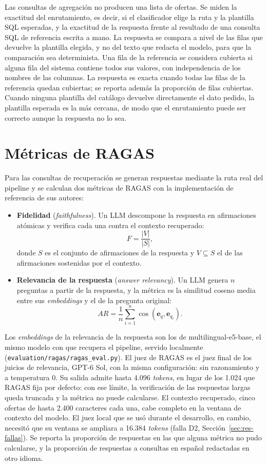 Las consultas de agregación no producen una lista de ofertas. Se miden la exactitud del enrutamiento, es decir, si el clasificador elige la ruta y la plantilla SQL esperadas, y la exactitud de la respuesta frente al resultado de una consulta SQL de referencia escrita a mano. La respuesta se compara a nivel de las filas que devuelve la plantilla elegida, y no del texto que redacta el modelo, para que la comparación sea determinista. Una fila de la referencia se considera cubierta si alguna fila del sistema contiene todos sus valores, con independencia de los nombres de las columnas. La respuesta es exacta cuando todas las filas de la referencia quedan cubiertas; se reporta además la proporción de filas cubiertas. Cuando ninguna plantilla del catálogo devuelve directamente el dato pedido, la plantilla esperada es la más cercana, de modo que el enrutamiento puede ser correcto aunque la respuesta no lo sea.

\section{Métricas de RAGAS}
\label{anx:ragas}

Para las consultas de recuperación se generan respuestas mediante la ruta real del pipeline y se calculan dos métricas de RAGAS \citep{Es2024} con la implementación de referencia de sus autores:
\begin{itemize}
    \item \textbf{Fidelidad} (\textit{faithfulness}). Un LLM descompone la respuesta en afirmaciones atómicas y verifica cada una contra el contexto recuperado:
    \[
    F = \frac{|V|}{|S|},
    \]
    donde $S$ es el conjunto de afirmaciones de la respuesta y $V \subseteq S$ el de las afirmaciones sostenidas por el contexto.
    \item \textbf{Relevancia de la respuesta} (\textit{answer relevancy}). Un LLM genera $n$ preguntas a partir de la respuesta, y la métrica es la similitud coseno media entre sus \textit{embeddings} y el de la pregunta original:
    \[
    AR = \frac{1}{n}\sum_{i=1}^{n} \cos(\mathbf{e}_q, \mathbf{e}_{q_i}).
    \]
\end{itemize}
Los \textit{embeddings} de la relevancia de la respuesta son los de multilingual-e5-base, el mismo modelo con que recupera el pipeline, servido localmente (\texttt{evaluation/\allowbreak ragas/\allowbreak ragas\_eval.py}). El juez de RAGAS es el juez final de los juicios de relevancia, GPT-6 Sol, con la misma configuración: sin razonamiento y a temperatura 0. Su salida admite hasta 4.096 \textit{tokens}, en lugar de los 1.024 que RAGAS fija por defecto: con ese límite, la verificación de las respuestas largas queda truncada y la métrica no puede calcularse. El contexto recuperado, cinco ofertas de hasta 2.400 caracteres cada una, cabe completo en la ventana de contexto del modelo. El juez local que se usó durante el desarrollo, en cambio, necesitó que su ventana se ampliara a 16.384 \textit{tokens} (falla D2, Sección~\ref{sec:res-fallas}). Se reporta la proporción de respuestas en las que alguna métrica no pudo calcularse, y la proporción de respuestas a consultas en español redactadas en otro idioma.

